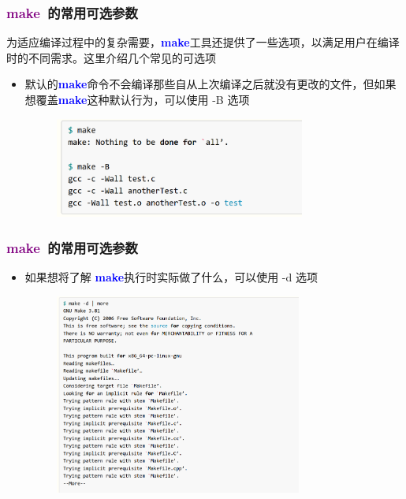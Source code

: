 \frame
{
	\frametitle{\textcolor{purple}{\textbf{make}}~的常用可选参数}
	为适应编译过程中的复杂需要，\textcolor{blue}{\textbf{make}}工具还提供了一些选项，以满足用户在编译时的不同需求。这里介绍几个常见的可选项
	\begin{itemize}
		\item 默认的\textcolor{blue}{\textbf{make}}命令不会编译那些自从上次编译之后就没有更改的文件，但如果想覆盖\textcolor{blue}{\textbf{make}}这种默认行为，可以使用 \textrm{-B} 选项
\begin{figure}[h!]
	\vskip -4pt
\centering
\includegraphics[height=1.3in,clip]{Figures/Make_Makefile_7.png}
\label{Fig:Make_Makefile_7}
\end{figure}
	\end{itemize}
}

\frame
{
	\frametitle{\textcolor{purple}{\textbf{make}}~的常用可选参数}
	\begin{itemize}
\item 如果想将了解 \textcolor{blue}{\textbf{make}}执行时实际做了什么，可以使用 \textrm{-d} 选项
\begin{figure}[h!]
	\vskip -5pt
\centering
\includegraphics[height=2.6in,clip]{Figures/Make_Makefile_8.png}
\label{Fig:Make_Makefile_8}
\end{figure}
	\end{itemize}
}

